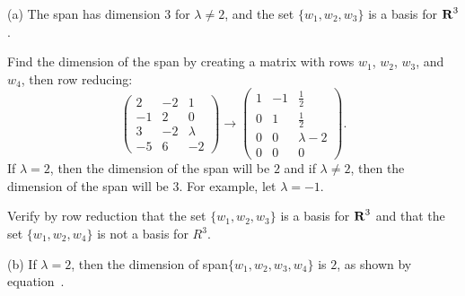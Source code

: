 \documentclass{ximera}
\begin{document}
(a) \ans The span has dimension $3$ for $\lambda \neq 2$, and 
the set $\{w_1,w_2,w_3\}$ is a basis for $\mbox{$\bf{R}$}^3$.

\soln Find the dimension of the span by creating a matrix with rows
$w_1$, $w_2$, $w_3$, and $w_4$, then row reducing:
\begin{equation} \label{exeq:5.6.4}
\left(\begin{array}{rrr} 2 & -2 & 1 \\ -1 & 2 & 0 \\ 3 & -2 &
\lambda \\ -5 & 6 & -2 \end{array}\right) \longrightarrow
\left(\begin{array}{rrc} 1 & -1 & \frac{1}{2} \\ 0 & 1 & \frac{1}{2}
\\ 0 & 0 & \lambda - 2 \\ 0 & 0 & 0 \end{array}\right).
\end{equation}
If $\lambda = 2$, then the dimension of the span will
be $2$ and if $\lambda \neq 2$, then the dimension of the span
will be $3$.  For example, let $\lambda = -1$.

\para Verify by row reduction that the set $\{w_1,w_2,w_3\}$ is a basis
for $\mbox{$\bf{R}$}^3$ and that the set $\{w_1,w_2,w_4\}$ is not a basis for $R^3$. 

(b) If $\lambda = 2$, then the dimension of span$\{w_1,w_2,w_3,w_4\}$
is $2$, as shown by equation~.
\end{document}
